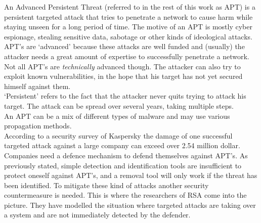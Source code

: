 An Advanced Persistent Threat (referred to in the rest of this work as APT) is a persistent targeted attack that tries to penetrate a network to cause harm while staying unseen for a long period of time. The motive of an APT is mostly cyber espionage, stealing sensitive data, sabotage or other kinds of ideological attacks. APT's are `advanced' because these attacks are well funded and (usually) the attacker needs a great amount of expertise to successfully penetrate a network. Not all APT's are \textit{technically} advanced though. The attacker can also try to exploit known vulnerabilities, in the hope that his target has not yet secured himself against them. \\
`Persistent' refers to the fact that the attacker never quits trying to attack his target. The attack can be spread over several years, taking multiple steps.  \\
An APT can be a mix of different types of malware and may use various propagation methods. \\
%
%
%
%
%

 
According to a security survey of Kaspersky \cite{SurveyKaspersky}  the damage of one successful targeted attack against a large company can exceed over 2.54 million dollar. Companies need a defence mechanism to defend themselves against APT's. As previously stated, simple detection and identification tools are insufficient to protect oneself against APT's, and a removal tool will only work if the threat has been identified. To mitigate these kind of attacks another security countermeasure is needed. This is where the researchers of RSA come into the picture. They have modelled the situation where targeted attacks are taking over a system and are not immediately detected by the defender. 




